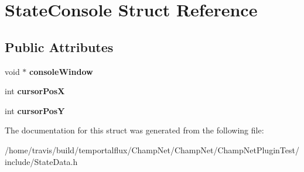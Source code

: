 \hypertarget{struct_state_console}{\section{State\-Console Struct Reference}
\label{struct_state_console}
}
\subsection*{Public Attributes}
\begin{DoxyCompactItemize}
\item 
\hypertarget{struct_state_console_a101e38bf2e857e66c26c4372e5e1d287}{void $\ast$ {\bfseries console\-Window}}\label{struct_state_console_a101e38bf2e857e66c26c4372e5e1d287}

\item 
\hypertarget{struct_state_console_ae75b5a93145d506e18b8ee8c3c1f4e2b}{int {\bfseries cursor\-Pos\-X}}\label{struct_state_console_ae75b5a93145d506e18b8ee8c3c1f4e2b}

\item 
\hypertarget{struct_state_console_a76f3facf37788fb17949a59e1829ccd5}{int {\bfseries cursor\-Pos\-Y}}\label{struct_state_console_a76f3facf37788fb17949a59e1829ccd5}

\end{DoxyCompactItemize}


The documentation for this struct was generated from the following file\-:\begin{DoxyCompactItemize}
\item 
/home/travis/build/temportalflux/\-Champ\-Net/\-Champ\-Net/\-Champ\-Net\-Plugin\-Test/include/State\-Data.\-h\end{DoxyCompactItemize}
